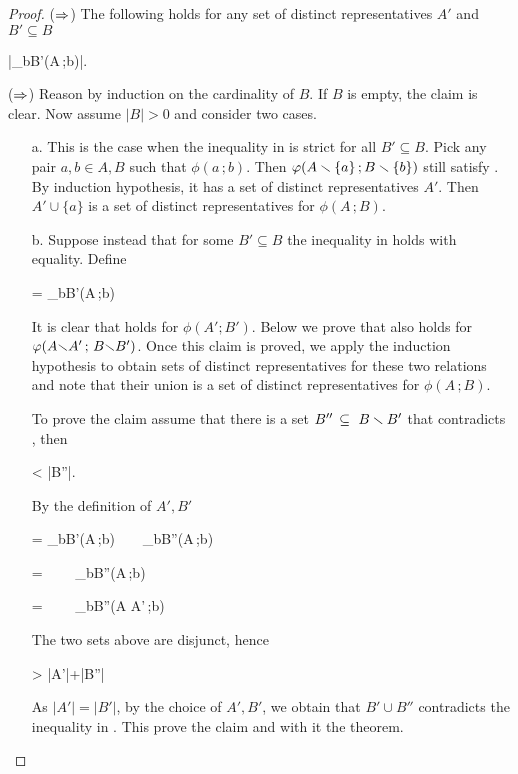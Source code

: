 \documentclass[scombinatorics.tex]{subfiles}
\begin{document}
\begin{proof}
  ($\Rightarrow$)
  The following holds for any set of distinct representatives $A'$ and $B'\subseteq B$  

  {\subseteq}
  {\bigg|\bigcup_{b\in B'}\phi(A\,;b)\bigg|.}

  ($\Rightarrow$)
  Reason by induction on the cardinality of $B$.
  If $B$ is empty, the claim is clear.
  Now assume $|B|>0$ and consider two cases.

  \begin{itemize}
    \item[a.]
    This is the case when the inequality in  is strict for all $B'\subseteq B$. 
    Pick any pair $a,b\in A,B$ such that $\phi(a\,;b)$. 
    Then $\varphi(A\smallsetminus\{a\}\,; B\smallsetminus\{b\})$ still satisfy .
    By induction hypothesis, it has a set of distinct representatives $A'$.
    Then $A'\cup\{a\}$ is a set of distinct representatives for $\phi(A\,;B)$.

    
    \item[b.]
    Suppose instead that for some $B'\subseteq B$ the inequality in  holds with equality.
    Define

    {=}
    {\bigcup_{b\in B'}\phi(A\,;b)}
    
    It is clear that  holds for $\phi(A';B')$.
    Below we prove that  also holds for $\varphi(A{\smallsetminus} A'\,;\,{B\smallsetminus} B')$.
    Once this claim is proved, we apply the induction hypothesis to obtain sets of distinct representatives for these two relations and note that their union is a set of distinct representatives for $\phi(A\,;B)$.

    To prove the claim assume that there is a set $B''\,\subseteq\ B\smallsetminus B'$ that contradicts , then

    {<}
    {|B''|.}

    By the definition of $A',B'$

    {=}
    {\bigcup_{b\in B'}\phi(A\,;b)\ \ \cup\ \ \bigcup_{b\in B''}\phi(A\,;b)}

    \ceq{}
    {=}
    {\ \ \cup\ \ \bigcup_{b\in B''}\phi(A\,;b)}

    \ceq{}
    {=}
    {\ \ \cup\ \ \bigcup_{b\in B''}\phi(A{\sm} A'\,;b)}

    The two sets above are disjunct, hence 

    {>}
    {|A'|+|B''|}

    As $|A'|=|B'|$, by the choice of $A',B'$, we obtain that $B'\cup B''$ contradicts the inequality in .
    This prove the claim and with it the theorem.
  \end{itemize}\vspace*{-4ex}
\end{proof}
\end{document}
